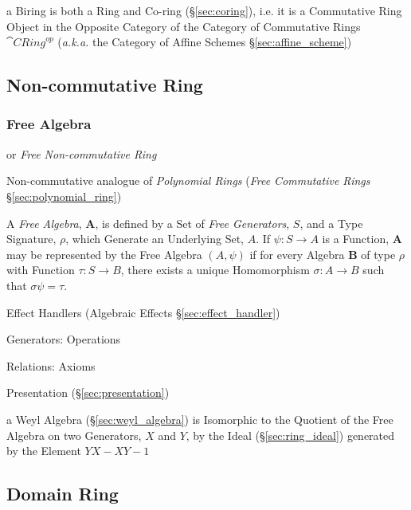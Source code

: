 a Biring is both a Ring and Co-ring (\S\ref{sec:coring}), i.e. it is a
Commutative Ring Object in the Opposite Category of the Category of Commutative
Rings $\cat{CRing}^{op}$ (\emph{a.k.a.} the Category of Affine Schemes
\S\ref{sec:affine_scheme})



\subsection{Non-commutative Ring}\label{sec:noncommutative_ring}

\subsubsection{Free Algebra}\label{sec:free_algebra}

or \emph{Free Non-commutative Ring}

Non-commutative analogue of \emph{Polynomial Rings} (\emph{Free Commutative
  Rings} \S\ref{sec:polynomial_ring})

A \emph{Free Algebra}, $\mathbf{A}$, is defined by a Set of \emph{Free
  Generators}, $S$, and a Type Signature, $\rho$, which Generate an
Underlying Set, $A$. If $\psi : S \rightarrow A$ is a Function,
$\mathbf{A}$ may be represented by the Free Algebra $(A,\psi)$ if for
every Algebra $\mathbf{B}$ of type $\rho$ with Function $\tau : S
\rightarrow B$, there exists a unique Homomorphism $\sigma : A
\rightarrow B$ such that $\sigma\psi = \tau$.

Effect Handlers (Algebraic Effects \S\ref{sec:effect_handler})

Generators: Operations

Relations: Axioms

Presentation (\S\ref{sec:presentation})

\fist a Weyl Algebra (\S\ref{sec:weyl_algebra}) is Isomorphic to the Quotient
of the Free Algebra on two Generators, $X$ and $Y$, by the Ideal
(\S\ref{sec:ring_ideal}) generated by the Element $YX - XY - 1$



\subsection{Domain Ring}\label{sec:domain_ring}

